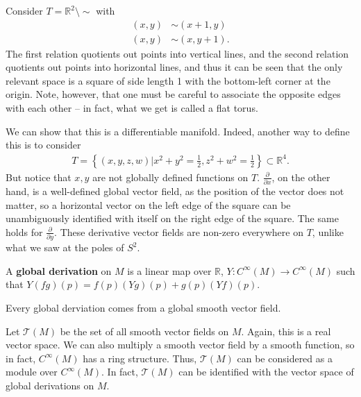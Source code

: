 \documentclass{../mathnotes}
\begin{document}
\begin{exmp}
    Consider $T=\mathbb{R}^2\setminus{\sim}$ with
    \begin{align*}
        (x,y)&\sim(x+1,y)\\
        (x,y)&\sim(x,y+1).
    \end{align*}
    The first relation quotients out points into vertical lines, and the second relation quotients out points into horizontal lines, and thus
    it can be seen that the only relevant space is a square of side length 1 with the bottom-left corner at the origin. Note, however, that one
    must be careful to associate the opposite edges with each other -- in fact, what we get is called a flat torus.

    We can show that this is a differentiable manifold. Indeed, another way to define this is to consider
    \begin{align*}
        T=\left\{ (x,y,z,w)|x^2+y^2=\frac{1}{2}, z^2+w^2=\frac{1}{2} \right\}\subset \mathbb{R}^4.
    \end{align*}
    But notice that $x,y$ are not globally defined functions on $T$. $\frac{\partial}{\partial x}$, on the other hand, is a well-defined global vector field,
    as the position of the vector does not matter, so a horizontal vector on the left edge of the square can be unambiguously identified with itself on the
    right edge of the square. The same holds for $\frac{\partial}{\partial y}$. These derivative vector fields are non-zero everywhere on $T$, unlike what
    we saw at the poles of $S^2$.
\end{exmp}

\begin{defn}
    A \textbf{global derivation} on $M$ is a linear map over $\mathbb{R}$, $Y:C^\infty(M)\to C^\infty(M)$ such that $Y(fg)(p)=f(p)(Yg)(p)+g(p)(Yf)(p)$. 
\end{defn}

\begin{thm}
    Every global derviation comes from a global smooth vector field.
\end{thm}

\begin{defn}
    Let $\mathcal{T}(M)$ be the set of all smooth vector fields on $M$. Again, this is a real vector space. We can also multiply a smooth vector
    field by a smooth function, so in fact, $C^\infty(M)$ has a ring structure. Thus, $\mathcal{T}(M)$ can be considered as a module over $C^\infty(M)$.
    In fact, $\mathcal{T}(M)$ can be identified with the vector space of global derivations on $M$.
\end{defn}
\end{document}
